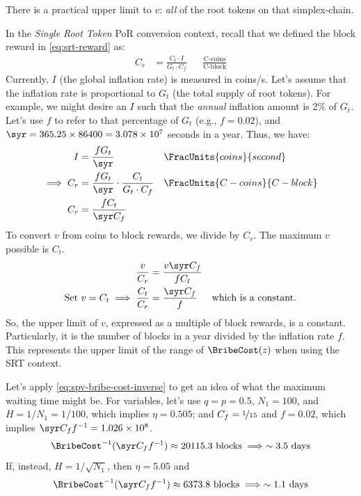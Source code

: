 There is a practical upper limit to $v$: \emph{all} of the root tokens on that simplex-chain.

In the \emph{Single Root Token} PoR conversion context, recall that we defined the block reward in \autoref{eq:srt-reward} as:
\begin{align*}
    C_r &= \frac{C_t \cdot I}{G_t \cdot C_f} & & \frac{\text{C-coins}}{\text{C-block}}
\end{align*}
Currently, $I$ (the global inflation rate) is measured in coins/s.
Let's assume that the inflation rate is proportional to $G_t$ (the total supply of root tokens).
For example, we might desire an $I$ such that the \emph{annual} inflation amount is 2\% of $G_t$.
Let's use $f$ to refer to that percentage of $G_t$ (e.g., $f = 0.02$), and $\syr = 365.25 \times 86400 = 3.078 \times 10^{7}$ seconds in a year.
Thus, we have:
\begin{align}
    I &= \frac{f G_t}{\syr}
        & & \FracUnits{coins}{second} \nonumber \\
    \implies C_r &= \frac{f G_t}{\syr} \cdot \frac{C_t}{G_t \cdot C_f}
        & & \FracUnits{C-coins}{C-block} \nonumber \\
    C_r &= \frac{f C_t}{\syr C_f} \label{eq:block-reward-to-ct}
\end{align}
To convert $v$ from coins to block rewards, we divide by $C_r$.
The maximum $v$ possible is $C_t$.
\begin{align*}
    \frac{v}{C_r} &= \frac{v \syr C_f}{f C_t} \\
    \text{Set } v = C_t \implies \frac{C_t}{C_r} &= \frac{\syr C_f}{f} & \text{which is a constant.}
\end{align*}
So, the upper limit of $v$, expressed as a multiple of block rewards, is a constant.
Particularly, it is the number of blocks in a year divided by the inflation rate $f$.
This represents the upper limit of the range of $\BribeCost(z)$ when using the SRT context.

Let's apply \autoref{eq:spv-bribe-cost-inverse} to get an idea of what the maximum waiting time might be.
For variables, let's use $q = p = 0.5$, $N_1 = 100$, and $H = 1/N_1 = 1/100$, which implies $\eta = 0.505$; and $C_f = \nicefrac{1}{15}$ and $f = 0.02$, which implies $\syr C_f f^{-1} = 1.026 \times 10^8$.
\begin{equation*}
    \BribeCost^{-1}(\syr C_f f^{-1}) \approx 20 115.3 \text{ blocks}
        \implies \sim 3.5 \text{ days}
\end{equation*}
If, instead, $H = 1/\sqrt{N_1}$, then $\eta = 5.05$ and
\begin{equation*}
    \BribeCost^{-1}(\syr C_f f^{-1}) \approx 6373.8 \text{ blocks}
        \implies \sim 1.1 \text{ days}
\end{equation*}



